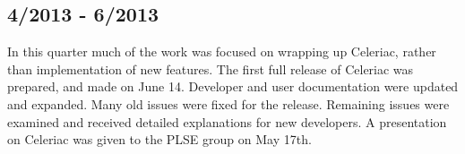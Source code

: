 \documentclass{article}
\newcommand{\timetbl}[4]{\par\vspace{5mm}\begin{tabular}{ l l l l }
Estimated Completion Date: & #1 & Estimated Completion Time: & #2 \\
Actual Completion Date: & #3 & Actual Completion Time: & #4 \\
\end{tabular}}
\begin{document}
\subsection{4/2013 - 6/2013}
In this quarter much of the work was focused on wrapping up Celeriac, rather than implementation of new features. The first full release of Celeriac was prepared, and made on June 14. Developer and user documentation were updated and expanded. Many old issues were fixed for the release. Remaining issues were examined and received detailed explanations for new developers. A presentation on Celeriac was given to the PLSE group on May 17th.

\end{document}
